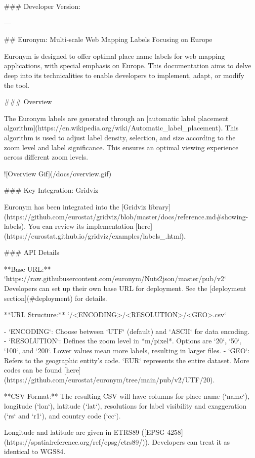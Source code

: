### Developer Version:

---

## Euronym: Multi-scale Web Mapping Labels Focusing on Europe

Euronym is designed to offer optimal place name labels for web mapping applications, with special emphasis on Europe. This documentation aims to delve deep into its technicalities to enable developers to implement, adapt, or modify the tool.

### Overview

The Euronym labels are generated through an [automatic label placement algorithm](https://en.wikipedia.org/wiki/Automatic_label_placement). This algorithm is used to adjust label density, selection, and size according to the zoom level and label significance. This ensures an optimal viewing experience across different zoom levels.

![Overview Gif](/docs/overview.gif)

### Key Integration: Gridviz

Euronym has been integrated into the [Gridviz library](https://github.com/eurostat/gridviz/blob/master/docs/reference.md#showing-labels). You can review its implementation [here](https://eurostat.github.io/gridviz/examples/labels_.html).

### API Details

**Base URL:** `https://raw.githubusercontent.com/euronym/Nuts2json/master/pub/v2`  
Developers can set up their own base URL for deployment. See the [deployment section](#deployment) for details.

**URL Structure:** `/<ENCODING>/<RESOLUTION>/<GEO>.csv`

- `ENCODING`: Choose between `UTF` (default) and `ASCII` for data encoding.
- `RESOLUTION`: Defines the zoom level in *m/pixel*. Options are `20`, `50`, `100`, and `200`. Lower values mean more labels, resulting in larger files.
- `GEO`: Refers to the geographic entity's code. `EUR` represents the entire dataset. More codes can be found [here](https://github.com/eurostat/euronym/tree/main/pub/v2/UTF/20).

**CSV Format:**  
The resulting CSV will have columns for place name (`name`), longitude (`lon`), latitude (`lat`), resolutions for label visibility and exaggeration (`rs` and `r1`), and country code (`cc`).

Longitude and latitude are given in ETRS89 ([EPSG 4258](https://spatialreference.org/ref/epsg/etrs89/)). Developers can treat it as identical to WGS84.

